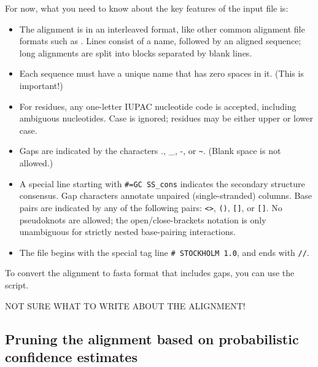 For now, what you need to know about the key features of the input file is:
\begin{itemize}
\item The alignment is in an interleaved format, like other
common alignment file formats such as .
Lines consist of a name, followed by an aligned sequence;
long alignments are split into blocks separated by blank lines.
\item Each sequence must have a unique name that has zero spaces in it. (This is important!)
\item For residues, any one-letter IUPAC nucleotide code is accepted,
      including ambiguous nucleotides. Case is ignored; residues
      may be either upper or lower case.
\item Gaps are indicated by the characters ., \_, -, or \verb+~+.
      (Blank space is not allowed.)
\item A special line starting with {\small\verb+#=GC SS_cons+} indicates
      the secondary structure consensus. Gap characters annotate
      unpaired (single-stranded) columns. Base pairs are indicated
      by any of the following pairs: \verb+<>+, \verb+()+, \verb+[]+,
      or \verb+[]+. No pseudoknots are allowed; the
      open/close-brackets notation is only unambiguous for strictly
      nested base-pairing interactions.
\item The file begins with the special tag line
      {\small\verb+# STOCKHOLM 1.0+}, and ends with {\small\verb+//+}.
\end{itemize}

To convert the alignment to fasta format that includes gaps, you can use the
 script. 

NOT SURE WHAT TO WRITE ABOUT THE ALIGNMENT!

\subsection{Pruning the alignment based on probabilistic confidence
  estimates}
